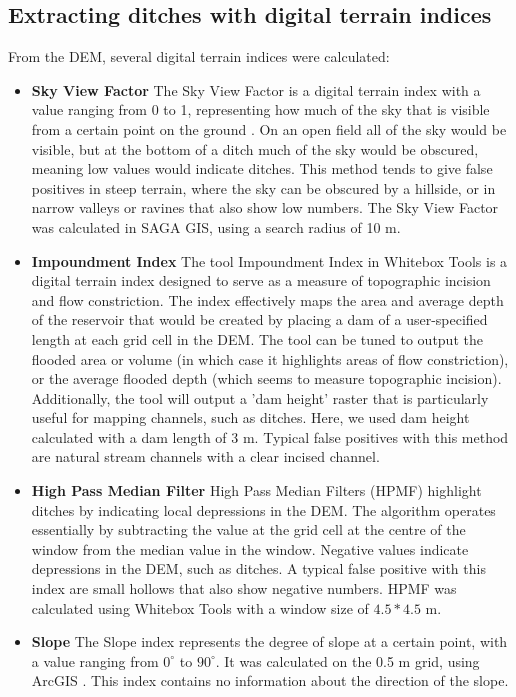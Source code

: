 \documentclass[]{interact}
\theoremstyle{plain}%
\theoremstyle{definition}
\theoremstyle{remark}
\begin{document}
\subsection{Extracting ditches with digital terrain indices}
From the DEM, several digital terrain indices were calculated:
\begin{itemize} \label{data_attributes}

  \item \textbf{Sky View Factor} \newline
  The Sky View Factor is a digital terrain index with a value ranging from 0 to 1, representing how much of the sky that is visible from a certain point on the ground \citep{zaksek}. On an open field all of the sky would be visible, but at the bottom of a ditch much of the sky would be obscured, meaning low values would indicate ditches. This method tends to give false positives in steep terrain, where the sky can be obscured by a hillside, or in narrow valleys or ravines that also show low numbers. The Sky View Factor was calculated in SAGA GIS, using a search radius of 10 m.

  \item \textbf{Impoundment Index}\newline
  The tool Impoundment Index in Whitebox Tools \citep{whiteboxtools} is a digital terrain index designed to serve as a measure of topographic incision and flow constriction. The index effectively maps the area and average depth of the reservoir that would be created by placing a dam of a user-specified length at each grid cell in the DEM. The tool can be tuned to output the flooded area or volume (in which case it highlights areas of flow constriction), or the average flooded depth (which seems to measure topographic incision). Additionally, the tool will output a 'dam height' raster that is particularly useful for mapping channels, such as ditches. Here, we used dam height calculated with a dam length of 3 m. Typical false positives with this method are natural stream channels with a clear incised channel.
  
  \item \textbf{High Pass Median Filter} \newline
  High Pass Median Filters (HPMF) highlight ditches by indicating local depressions in the DEM. The algorithm operates essentially by subtracting the value at the grid cell at the centre of the window from the median value in the window. Negative values indicate depressions in the DEM, such as ditches. A typical false positive with this index are small hollows that also show negative numbers. HPMF was calculated using Whitebox Tools \citep{whiteboxtools} with a window size of $4.5 * 4.5$ m. 

    \item \textbf{Slope} \newline
    The Slope index represents the degree of slope at a certain point, with a value ranging from $0^{\circ}$ to $90^{\circ}$. It was calculated on the 0.5 m grid, using ArcGIS \citep{EsriArcGisBook}. This index contains no information about the direction of the slope.
\end{itemize}
\end{document}
